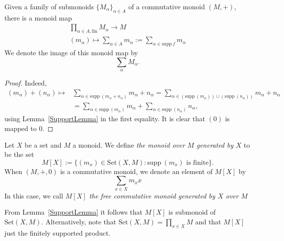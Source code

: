 \begin{lemma}\label{SumOfCommutativeSubmonoids}
    Given a family of submonoids $\{M_\alpha\}_{\alpha\in A}$ of a commutative monoid $(M,+)$, there is a monoid map
    \begin{gather*}
        \prod_{\alpha\in A, \mathrm{fin}} M_\alpha \rightarrow M\\
        (m_\alpha) \mapsto \sum_{\alpha\in A} m_\alpha:= \sum_{\alpha \in \mathrm{supp}\ f} m_\alpha
    \end{gather*}
    We denote the image of this monoid map by 
    $$
        \sum_{\alpha} M_\alpha.
    $$
\end{lemma}
\begin{proof}
    Indeed,
    \begin{align*}
        (m_\alpha)+(n_\alpha)\mapsto &\sum_{\alpha\in \mathrm{supp} \ (m_\alpha+n_\alpha)} m_\alpha+n_\alpha = \sum_{\alpha\in (\mathrm{supp} \ (m_\alpha)) \cup( \mathrm{supp} \ (n_\alpha))} m_\alpha + n_\alpha \\
        &= \sum_{\alpha \in \mathrm{supp} \ (m_\alpha)} m_\alpha + \sum_{\alpha\in \mathrm{supp} \ (n_\alpha)} n_\alpha,
    \end{align*}
    using Lemma~\ref{SupportLemma} in the first equality. It is clear that $(0)$ is mapped to $0$. 
\end{proof}
\begin{definition}
    Let $X$ be a set and $M$ a monoid. We define \emph{the monoid over $M$ generated by $X$} to be the set 
    $$
        M[X] := \{(m_x)\in \mathrm{Set}(X,M) : \mathrm{supp} \ (m_x) \text{ is finite}\}.
    $$
    When $(M,+,0)$ is a commutative monoid, we denote an element of $M[X]$ by 
    $$
        \sum_{x\in X}m_x x
    $$
    In this case, we call $M[X]$ \emph{the free commutative monoid generated by $X$ over $M$}
\end{definition}
\begin{remark}
    From Lemma~\ref{SupportLemma} it follows that $M[X]$ is submonoid of $\mathrm{Set}(X,M)$. Alternatively, note that $\mathrm{Set}(X,M) = \prod_{x\in X} M$ and that $M[X]$ just the finitely supported product. 
\end{remark}
